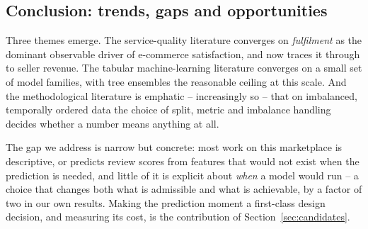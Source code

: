 \subsection{Conclusion: trends, gaps and opportunities}

Three themes emerge. The service-quality literature converges on \emph{fulfilment}
as the dominant observable driver of e-commerce satisfaction, and now traces it
through to seller revenue. The tabular machine-learning literature converges on a
small set of model families, with tree ensembles the reasonable ceiling at this
scale. And the methodological literature is emphatic -- increasingly so -- that on
imbalanced, temporally ordered data the choice of split, metric and imbalance
handling decides whether a number means anything at all.

The gap we address is narrow but concrete: most work on this marketplace is
descriptive, or predicts review scores from features that would not exist when
the prediction is needed, and little of it is explicit about \emph{when} a model
would run -- a choice that changes both what is admissible and what is
achievable, by a factor of two in our own results. Making the prediction moment
a first-class design decision, and measuring its cost, is the contribution of
Section~\ref{sec:candidates}.
